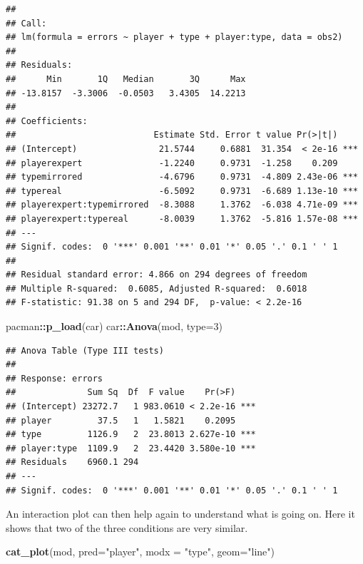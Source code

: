 \documentclass[
]{book}
\newenvironment{Shaded}{\begin{snugshade}}{\end{snugshade}}
\newcommand{\DataTypeTok}[1]{\textcolor[rgb]{0.13,0.29,0.53}{#1}}
\newcommand{\DecValTok}[1]{\textcolor[rgb]{0.00,0.00,0.81}{#1}}
\newcommand{\KeywordTok}[1]{\textcolor[rgb]{0.13,0.29,0.53}{\textbf{#1}}}
\newcommand{\NormalTok}[1]{#1}
\newcommand{\OperatorTok}[1]{\textcolor[rgb]{0.81,0.36,0.00}{\textbf{#1}}}
\newcommand{\StringTok}[1]{\textcolor[rgb]{0.31,0.60,0.02}{#1}}
\begin{document}
\begin{verbatim}
## 
## Call:
## lm(formula = errors ~ player + type + player:type, data = obs2)
## 
## Residuals:
##      Min       1Q   Median       3Q      Max 
## -13.8157  -3.3006  -0.0503   3.4305  14.2213 
## 
## Coefficients:
##                           Estimate Std. Error t value Pr(>|t|)    
## (Intercept)                21.5744     0.6881  31.354  < 2e-16 ***
## playerexpert               -1.2240     0.9731  -1.258    0.209    
## typemirrored               -4.6796     0.9731  -4.809 2.43e-06 ***
## typereal                   -6.5092     0.9731  -6.689 1.13e-10 ***
## playerexpert:typemirrored  -8.3088     1.3762  -6.038 4.71e-09 ***
## playerexpert:typereal      -8.0039     1.3762  -5.816 1.57e-08 ***
## ---
## Signif. codes:  0 '***' 0.001 '**' 0.01 '*' 0.05 '.' 0.1 ' ' 1
## 
## Residual standard error: 4.866 on 294 degrees of freedom
## Multiple R-squared:  0.6085,	Adjusted R-squared:  0.6018 
## F-statistic: 91.38 on 5 and 294 DF,  p-value: < 2.2e-16
\end{verbatim}

\begin{Shaded}
\begin{Highlighting}[]
\NormalTok{pacman}\OperatorTok{::}\KeywordTok{p_load}\NormalTok{(car)}
\NormalTok{car}\OperatorTok{::}\KeywordTok{Anova}\NormalTok{(mod, }\DataTypeTok{type=}\DecValTok{3}\NormalTok{)}
\end{Highlighting}
\end{Shaded}

\begin{verbatim}
## Anova Table (Type III tests)
## 
## Response: errors
##              Sum Sq  Df  F value    Pr(>F)    
## (Intercept) 23272.7   1 983.0610 < 2.2e-16 ***
## player         37.5   1   1.5821    0.2095    
## type         1126.9   2  23.8013 2.627e-10 ***
## player:type  1109.9   2  23.4420 3.580e-10 ***
## Residuals    6960.1 294                       
## ---
## Signif. codes:  0 '***' 0.001 '**' 0.01 '*' 0.05 '.' 0.1 ' ' 1
\end{verbatim}

An interaction plot can then help again to understand what is going on. Here it shows that two of the three conditions are very similar.

\begin{Shaded}
\begin{Highlighting}[]
\KeywordTok{cat_plot}\NormalTok{(mod, }\DataTypeTok{pred=}\StringTok{"player"}\NormalTok{, }\DataTypeTok{modx =} \StringTok{"type"}\NormalTok{, }\DataTypeTok{geom=}\StringTok{"line"}\NormalTok{)}
\end{Highlighting}
\end{Shaded}
\end{document}
